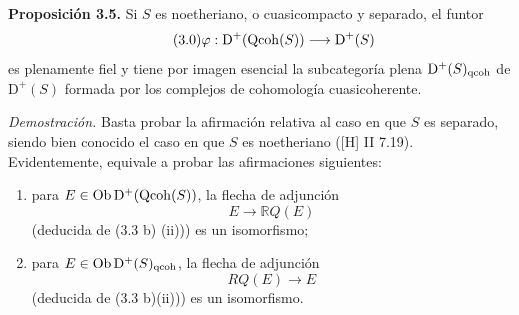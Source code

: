 \providecommand{\sisi}[2]{#2}

\textbf{Proposición 3.5.} Si $S$ es noetheriano, o cuasicompacto y separado, el funtor
\begin{equation}\tag{3.0}
 \varphi:\mathrm D^+(\operatorname{Qcoh}(S))\longrightarrow \mathrm D^+(S)
\end{equation}
es plenamente fiel y tiene por imagen esencial la subcategoría plena $\mathrm D^+(S)_{\mathrm{qcoh}}$ de $\mathrm D^+(S)$ formada por los complejos de cohomología cuasicoherente.

\emph{Demostración.} Basta probar la afirmación relativa al caso en que $S$ es separado, siendo bien conocido el caso en que $S$ es noetheriano ([H] II 7.19). Evidentemente, equivale a probar las afirmaciones siguientes:

\begin{enumerate}[label={(3.5.\arabic*)~:}]
\item para $E\in\operatorname{Ob}\mathrm D^+(\operatorname{Qcoh}(S))$, la flecha de adjunción
\[
 E\longrightarrow \mathbb RQ(E)
\]
(deducida de (3.3 b) (ii))) es un isomorfismo;
\item para $E\in\operatorname{Ob}\mathrm D^+(S)_{\mathrm{qcoh}}$, la flecha de adjunción
\[
 RQ(E)\longrightarrow E
\]
(deducida de (3.3 b)(ii))) es un isomorfismo.
\end{enumerate}

